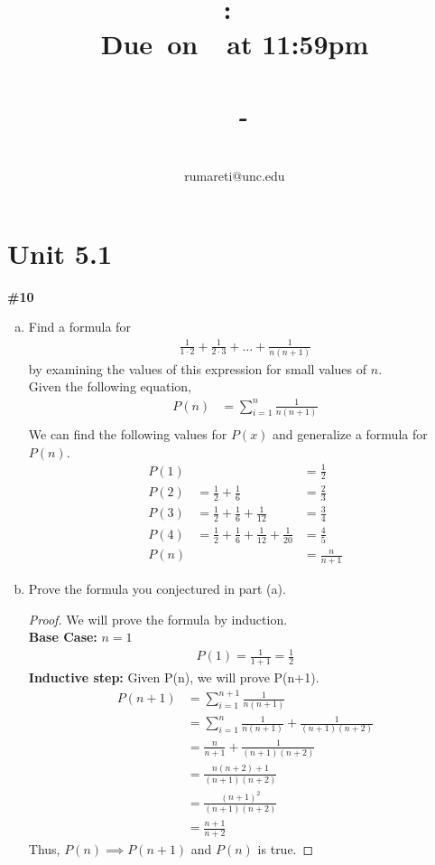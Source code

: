 \documentclass{article}
\title{
    \vspace{2in}
    \textmd{\textbf{\hmwkClass:\ \hmwkTitle}}\\
    \normalsize\vspace{0.1in}\small{\textbf{Due\ on\ \hmwkDueDate\ at 11:59pm}}\\
    \normalsize\text{Tuesday/Thursday 11:00-12:15, Phillips 383}\\
    \vspace{0.1in}\large{\textit{\hmwkClassInstructor\ - \hmwkClassTime}}
    \vspace{3in}
}
\author{\hmwkAuthorName\\\small{rumareti@unc.edu}}
\date{}
\newcommand{\unit}[1]{\section{Unit #1}}
\newcommand{\problem}[1]{\textbf{\##1}}
\newcommand{\prob}[1]{\problem{#1}}
\begin{document}
\maketitle

\pagebreak

\unit{5.1}
\prob{10}
\begin{enumerate}[a)]
    \item Find a formula for
    \begin{align*}
        \frac{1}{1\cdot2}+\frac{1}{2\cdot3}+\ldots+\frac{1}{n(n+1)}
    \end{align*}
    by examining the values of this expression for small values of \(n\).\\

Given the following equation,
\begin{align*}
    P(n) &= \sum_{i=1}^{n}\frac{1}{n(n+1)}\\
\end{align*}
We can find the following values for \(P(x)\) and generalize a formula for \(P(n)\).
\begin{align*}
    P(1) &&= \frac{1}{2}\\
    P(2) &= \frac{1}{2}+\frac{1}{6}&=\frac{2}{3}\\
    P(3) &= \frac{1}{2}+\frac{1}{6}+\frac{1}{12}&=\frac{3}{4}\\
    P(4) &= \frac{1}{2}+\frac{1}{6}+\frac{1}{12}+\frac{1}{20}&=\frac{4}{5}\\
    P(n) &&= \frac{n}{n+1}
\end{align*}
    \item Prove the formula you conjectured in part (a).
\begin{proof}
    We will prove the formula by induction.\\
    \textbf{Base Case:} \(n=1\)
    \begin{align*}
        P(1) = \frac{1}{1+1} = \frac{1}{2}
    \end{align*}
    \textbf{Inductive step:}
    Given P(n), we will prove P(n+1).
    \begin{align*}
        P(n+1) &= \sum_{i=1}^{n+1}\frac{1}{n(n+1)}\\
        &= \sum_{i=1}^{n}\frac{1}{n(n+1)}+\frac{1}{(n+1)(n+2)}\\
        &= \frac{n}{n+1}+\frac{1}{(n+1)(n+2)}\\
        &= \frac{n(n+2)+1}{(n+1)(n+2)}\\
        &= \frac{(n+1)^2}{(n+1)(n+2)}\\
        &= \frac{n+1}{n+2}
    \end{align*}
    Thus, \(P(n) \implies P(n+1)\) and \(P(n)\) is true.
\end{proof}
\end{enumerate}
\end{document}
